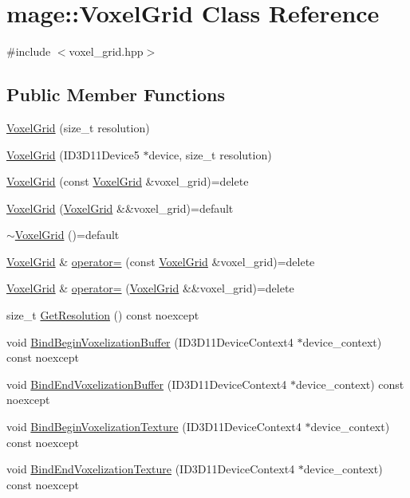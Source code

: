 \hypertarget{classmage_1_1_voxel_grid}{}\section{mage\+:\+:Voxel\+Grid Class Reference}
\label{classmage_1_1_voxel_grid}


{\ttfamily \#include $<$voxel\+\_\+grid.\+hpp$>$}

\subsection*{Public Member Functions}
\begin{DoxyCompactItemize}
\item 
\hyperlink{classmage_1_1_voxel_grid_a82ef6def342bbc9e9139a081dc15a014}{Voxel\+Grid} (size\+\_\+t resolution)
\item 
\hyperlink{classmage_1_1_voxel_grid_a6933eec208760a5167a79dde4950598f}{Voxel\+Grid} (I\+D3\+D11\+Device5 $\ast$device, size\+\_\+t resolution)
\item 
\hyperlink{classmage_1_1_voxel_grid_a8f2c6b7b3539ef2dcc16b7a8bfc428fd}{Voxel\+Grid} (const \hyperlink{classmage_1_1_voxel_grid}{Voxel\+Grid} \&voxel\+\_\+grid)=delete
\item 
\hyperlink{classmage_1_1_voxel_grid_a6a1577cacfc5dff3325d37335c121268}{Voxel\+Grid} (\hyperlink{classmage_1_1_voxel_grid}{Voxel\+Grid} \&\&voxel\+\_\+grid)=default
\item 
\hyperlink{classmage_1_1_voxel_grid_a9ab2bfed5a09c1ac20641ba2ced1263e}{$\sim$\+Voxel\+Grid} ()=default
\item 
\hyperlink{classmage_1_1_voxel_grid}{Voxel\+Grid} \& \hyperlink{classmage_1_1_voxel_grid_ad8ff79b41ffdee12a3545d98208df40a}{operator=} (const \hyperlink{classmage_1_1_voxel_grid}{Voxel\+Grid} \&voxel\+\_\+grid)=delete
\item 
\hyperlink{classmage_1_1_voxel_grid}{Voxel\+Grid} \& \hyperlink{classmage_1_1_voxel_grid_add5f5cbd32fc8279e22f16526a6358d0}{operator=} (\hyperlink{classmage_1_1_voxel_grid}{Voxel\+Grid} \&\&voxel\+\_\+grid)=delete
\item 
size\+\_\+t \hyperlink{classmage_1_1_voxel_grid_aab221660115c414294020da22c3f40e3}{Get\+Resolution} () const noexcept
\item 
void \hyperlink{classmage_1_1_voxel_grid_a9a10856b6b5143f44c4197887ca1e5f0}{Bind\+Begin\+Voxelization\+Buffer} (I\+D3\+D11\+Device\+Context4 $\ast$device\+\_\+context) const noexcept
\item 
void \hyperlink{classmage_1_1_voxel_grid_a85c5192cac411d6669b301d728d39975}{Bind\+End\+Voxelization\+Buffer} (I\+D3\+D11\+Device\+Context4 $\ast$device\+\_\+context) const noexcept
\item 
void \hyperlink{classmage_1_1_voxel_grid_a8d4700827e9f0385dbe5e82c66915706}{Bind\+Begin\+Voxelization\+Texture} (I\+D3\+D11\+Device\+Context4 $\ast$device\+\_\+context) const noexcept
\item 
void \hyperlink{classmage_1_1_voxel_grid_a4efbdaca117973b02e6c266a3c9a8103}{Bind\+End\+Voxelization\+Texture} (I\+D3\+D11\+Device\+Context4 $\ast$device\+\_\+context) const noexcept
\end{DoxyCompactItemize}

